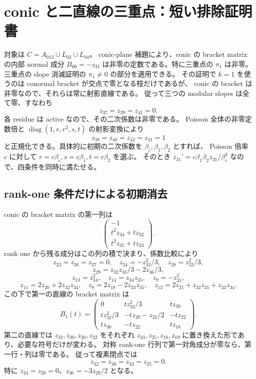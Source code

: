 \section{conic と二直線の三重点：短い排除証明書}

対象は $C=A_{012}\cup L_{03}\cup L_{04}$。
conic-plane 補題により、conic の bracket matrix の内部 normal 成分
$B_{00}=-z_{31}$ は非零の定数である。特に三重点の $\pi_1$ は非零。
三重点の slope 消滅証明の $\pi_1\ne0$ の部分を適用できる。
その証明で $k=1$ を使うのは conormal bracket が交点で零となる枝だけであるが、
conic の bracket は非零なので、それらは常に射影直線である。
従って三つの modular slopes は全て零、すなわち
\[
z_{37}=z_{39}=z_{41}=0.
\]
各 residue は active なので、その二次係数は非零である。
Poisson 全体の非零定数倍と $\operatorname{diag}(1,r,r^2,s,t)$ の射影変換により
\[
z_{38}=z_{40}=z_{42}=z_{31}=1
\]
と正規化できる。具体的に初期の二次係数を $\beta_c,\beta_1,\beta_2$ とすれば、
Poisson 倍率 $c$ に対して $r=c\beta_c,s=c\beta_1,t=c\beta_2$ を選ぶ。
そのとき $z_{31}'=c\beta_1\beta_2 z_{31}/\beta_c^2$ なので、四条件を同時に満たせる。

\subsection{rank-one 条件だけによる初期消去}

conic の bracket matrix の第一列は
\[
\begin{pmatrix}-1\\t^2z_{34}+tz_{32}\\t^2z_{35}+tz_{33}\end{pmatrix}.
\]
rank one から残る成分はこの列の積で決まり、係数比較により
\[
z_{23}=z_{26}=z_{27}=0,\quad
z_{24}=-z_{33}^2/3,\quad z_{28}=z_{32}^2/3,
\]
\[
z_{29}=z_{32}z_{33}/3-2z_{36}/3,
\]
\[
z_{13}=z_{34}^2,\quad z_{14}=z_{34}z_{35},\quad z_9=-z_{35}^2,
\]
\[
z_{11}=2z_{20}+2z_{32}z_{34},\quad
z_8=2z_{18}-2z_{33}z_{35},\quad
z_{12}=2z_{21}+z_{32}z_{35}+z_{33}z_{34}.
\]
この下で第一の直線の bracket matrix は
\[
B_1(t)=
\begin{pmatrix}
0&tz_{32}^2/3&tz_{30}\\
tz_{32}^2/3&-tz_{20}-z_{32}/2&-tz_{22}\\
tz_{30}&-tz_{22}&tz_{16}
\end{pmatrix}.
\]
第二の直線では $z_{32},z_{30},z_{20},z_{22}$ をそれぞれ
$z_{33},z_{25},z_{18},z_{19}$ に置き換えた形であり、必要な符号だけが変わる。
対称 rank-one 行列で第一対角成分が零なら、第一行・列は零である。
従って複素閉点では
\[
z_{32}=z_{30}=z_{33}=z_{25}=0.
\]
特に $z_{24}=z_{28}=0$、$z_{36}=-3z_{29}/2$ となる。

